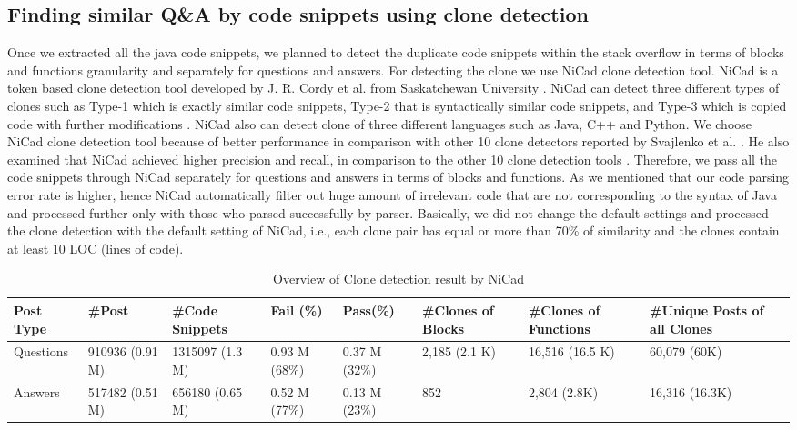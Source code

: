 \documentclass[conference]{IEEEtran}
\begin{document}
	\subsection{Finding similar Q\&A by code snippets using clone detection}
	Once we extracted all the java code snippets, we planned to detect the duplicate code snippets within the stack overflow in terms of blocks and functions granularity and separately for questions and answers. For detecting the clone we use NiCad \cite{b7} clone detection tool. NiCad is a token based clone detection tool developed by  J. R. Cordy et al. from  Saskatchewan University \cite{b7}.  NiCad can detect three different types of clones such as Type-1 which is exactly similar code snippets, Type-2 that is syntactically similar code snippets, and Type-3 which is copied code with further modifications \cite{b9}. NiCad also can detect clone of three different languages such as Java, C++ and Python. We choose NiCad clone detection tool because of better performance in comparison with other 10 clone detectors reported by Svajlenko et al. \cite{b6} . He also examined that NiCad achieved higher precision and recall, in comparison to the other 10 clone detection tools \cite{b6}. Therefore, we pass all the code snippets through NiCad separately for questions and answers in terms of blocks and functions. As we mentioned that our code parsing error rate is higher, hence NiCad automatically filter out huge amount of irrelevant code that are not corresponding to the syntax of Java and processed further only with those who parsed successfully by parser. Basically, we did not change the default settings and processed the clone detection with the default setting of NiCad, i.e., each clone pair has equal or more than 70\% of similarity and the clones contain at least 10 LOC (lines of code). 
	
	\begin{table*}[ht]
		\caption{Overview of Clone detection result by NiCad}
		\centering
		\begin{tabular}{l l l l l l l l }
			\hline\hline
			Post Type & \#Post & \#Code Snippets & Fail (\%)  & Pass(\%) & \#Clones of Blocks & \#Clones of Functions & \#Unique Posts of all Clones \\
			\hline
			Questions & 910936 (0.91 M) & 1315097 (1.3 M) & 0.93 M (68\%) & 0.37 M (32\%) & 2,185 (2.1 K) &  16,516 (16.5 K) & 60,079 (60K) \\
		    Answers & 517482 (0.51 M) & 656180 (0.65 M) & 0.52 M (77\%) & 0.13 M (23\%)& 852 & 2,804 (2.8K) & 16,316 (16.3K)  \\
			\hline
		\end{tabular}
		\label{table:NicadResult}
	\end{table*}
	
\end{document}
